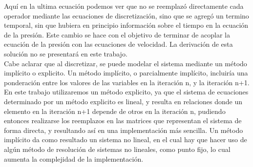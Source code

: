 \begin{minipage}{\linewidth}
Aquí en la ultima ecuación podemos ver que no se reemplazó directamente cada operador mediante las ecuaciones de discretización, sino que se agregó un termino temporal, sin que hubiera en principio información sobre el tiempo en la ecuación de la presión. Este cambio se hace con el objetivo de terminar de acoplar la ecuación de la presión con las ecuaciones de velocidad. La derivación de esta solución no se presentará en este trabajo.
~\\

Cabe aclarar que al discretizar, se puede modelar el sistema mediante un método implícito o explicito. Un método implícito, o parcialmente implícito, incluiría una ponderación entre los valores de las variables en la iteración n, y la iteración n+1. En este trabajo utilizaremos un método explicito, ya que el sistema de ecuaciones determinado por un método explicito es lineal, y resulta en relaciones donde un elemento en la iteración n+1 depende de otros en la iteración n, pudiendo entonces realizarse los reemplazos en las matrices que representan el sistema de forma directa, y resultando así en una implementación más sencilla. Un método implícito da como resultado un sistema no lineal, en el cual hay que hacer uso de algún método de resolución de sistemas no lineales, como punto fijo, lo cual aumenta la complejidad de la implementación.

\end{minipage}


